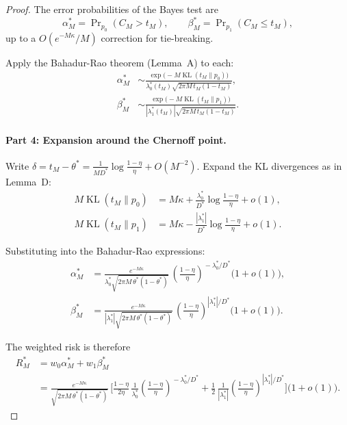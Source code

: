 \begin{proof}
  The error probabilities of the Bayes test are
  \[
  \alpha_M^* = \Pr\nolimits_{p_0}(C_M > t_M),\qquad
  \beta_M^*  = \Pr\nolimits_{p_1}(C_M \le t_M),
  \]
  up to a $O(e^{-M\kappa}/M)$ correction for tie-breaking.

  Apply the Bahadur-Rao theorem (Lemma~A) to each:
  \[
  \begin{aligned}
  \alpha_M^* &\sim
    \frac{\exp\!\bigl(-M\operatorname{KL}(t_M\|p_0)\bigr)}
         {\lambda_0^*(t_M)\sqrt{2\pi M\,t_M(1-t_M)}},\\[4pt]
  \beta_M^*  &\sim
    \frac{\exp\!\bigl(-M\operatorname{KL}(t_M\|p_1)\bigr)}
         {|\lambda_1^*(t_M)|\sqrt{2\pi M\,t_M(1-t_M)}}.
  \end{aligned}
  \]

  \paragraph{Part 4: Expansion around the Chernoff point.}
  Write $\delta = t_M-\theta^* = \frac1{M D^*}\log\frac{1-\eta}{\eta} + O(M^{-2})$.
  Expand the KL divergences as in Lemma~D:
  \[
  \begin{aligned}
  M\operatorname{KL}(t_M\|p_0)
  &= M\kappa + \frac{\lambda_0^*}{D^*}\log\frac{1-\eta}{\eta} + o(1),\\[4pt]
  M\operatorname{KL}(t_M\|p_1)
  &= M\kappa - \frac{|\lambda_1^*|}{D^*}\log\frac{1-\eta}{\eta} + o(1).
  \end{aligned}
  \]

  Substituting into the Bahadur-Rao expressions:
  \[
  \begin{aligned}
  \alpha_M^* &=
    \frac{e^{-M\kappa}}
         {\lambda_0^*\sqrt{2\pi M\,\theta^*(1-\theta^*)}}\,
    \left(\frac{1-\eta}{\eta}\right)^{\!-\lambda_0^*/D^*}
    \bigl(1+o(1)\bigr),\\[4pt]
  \beta_M^* &=
    \frac{e^{-M\kappa}}
         {|\lambda_1^*|\sqrt{2\pi M\,\theta^*(1-\theta^*)}}\,
    \left(\frac{1-\eta}{\eta}\right)^{\!|\lambda_1^*|/D^*}
    \bigl(1+o(1)\bigr).
  \end{aligned}
  \]

  The weighted risk is therefore
  \[
  \begin{aligned}
  R_M^* &=
    w_0\alpha_M^* + w_1\beta_M^* \\[4pt]
  &= \frac{e^{-M\kappa}}
          {\sqrt{2\pi M\,\theta^*(1-\theta^*)}}\,
     \Bigg[
       \frac{1-\eta}{2\eta}\,
       \frac1{\lambda_0^*}
       \left(\frac{1-\eta}{\eta}\right)^{\!-\lambda_0^*/D^*}
     + \frac12\,
       \frac1{|\lambda_1^*|}
       \left(\frac{1-\eta}{\eta}\right)^{\!|\lambda_1^*|/D^*}
     \Bigg] \bigl(1+o(1)\bigr).
  \end{aligned}
  \]


\end{proof}
